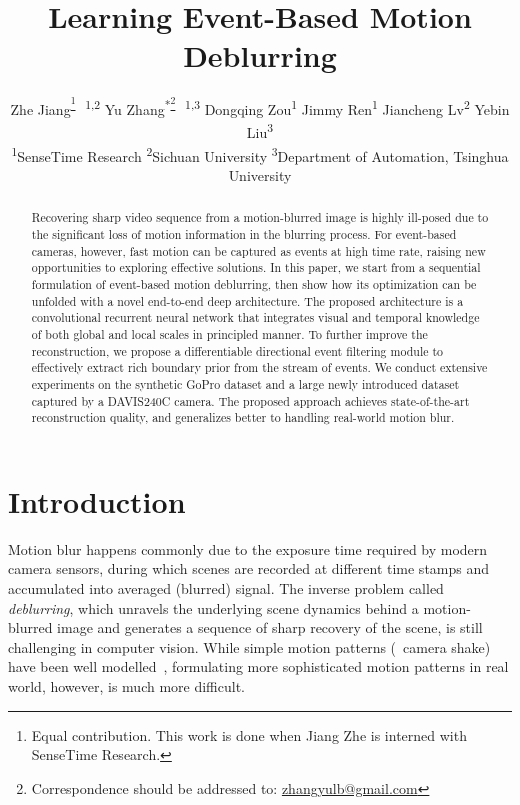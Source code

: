 \documentclass[10pt,twocolumn,letterpaper]{article}
\begin{document}
\title{Learning Event-Based Motion Deblurring}
\author{Zhe Jiang\textsuperscript{\thanks{Equal contribution. This work is done when Jiang Zhe is interned with SenseTime Research.} \ 1,2} \quad Yu Zhang\textsuperscript{*\thanks{Correspondence should be addressed to: \url{zhangyulb@gmail.com}} \ 1,3} \quad Dongqing Zou\textsuperscript{1} \quad Jimmy Ren\textsuperscript{1} \quad Jiancheng Lv\textsuperscript{2} \quad Yebin Liu\textsuperscript{3}\\
\textsuperscript{1}SenseTime Research \quad \textsuperscript{2}Sichuan University \quad \textsuperscript{3}Department of Automation, Tsinghua University
}

\maketitle


\begin{abstract}
   Recovering sharp video sequence from a motion-blurred image is highly ill-posed due to the significant loss of motion information in the blurring process. For event-based cameras, however, fast motion can be captured as events at high time rate, raising new opportunities to exploring effective solutions. In this paper, we start from a sequential formulation of event-based motion deblurring, then show how its optimization can be unfolded with a novel end-to-end deep architecture. The proposed architecture is a convolutional recurrent neural network that integrates visual and temporal knowledge of both global and local scales in principled manner. To further improve the reconstruction, we propose a differentiable directional event filtering module to effectively extract rich boundary prior from the stream of events. We conduct extensive experiments on the synthetic GoPro dataset and a large newly introduced dataset captured by a DAVIS240C camera. The proposed approach achieves state-of-the-art reconstruction quality, and generalizes better to handling real-world motion blur.
\end{abstract}

\vspace{-1mm}
\section{Introduction}
Motion blur happens commonly due to the exposure time required by modern camera sensors, during which scenes are recorded at different time stamps and accumulated into averaged (blurred) signal. The inverse problem called \textit{deblurring}, which unravels the underlying scene dynamics behind a motion-blurred image and generates a sequence of sharp recovery of the scene, is still challenging in computer vision. While simple motion patterns (\eg~camera shake) have been well modelled~\cite{PanCVPR16,MichaeliECCV14,ChakrabartiECCV16,DongICCV17,YanCVPR17,HirschICCV11,ZhangNIPS13,BahatICCV17}, formulating more sophisticated motion patterns in real world, however, is much more difficult.
\end{document}
